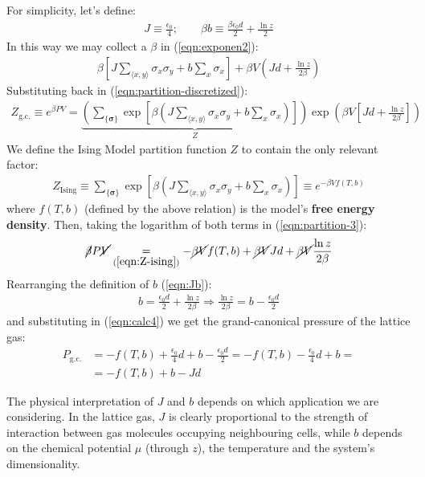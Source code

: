 \documentclass[../../main.tex]{subfiles}
\begin{document}
For simplicity, let's define:
\begin{align}\label{eqn:Jb}
    J \equiv \frac{\epsilon_0}{4}; \qquad \beta b \equiv \frac{\beta \epsilon_0 d}{2} + \frac{\ln z}{2}   
\end{align}
In this way we may collect a $\beta$ in (\ref{eqn:exponen2}):
\begin{align*}
    \beta \left[J \sum_{\langle x,y \rangle} \sigma_x \sigma_y + b \sum_x \sigma_x\right] + \beta V \left(J d + \frac{\ln z}{2 \beta} \right)
\end{align*}
Substituting back in (\ref{eqn:partition-discretized}):
\begin{align}\label{eqn:partition-3}
    Z_{\mathrm{g.c.}} \equiv e^{\beta PV} =\underbrace{ \left(\sum_{\{\bm{\sigma}\}} \exp\left[\beta \left(J \sum_{\langle x,y \rangle} \sigma_x \sigma_y + b \sum_x \sigma_x\right)\right] \right)}_{Z} \exp\left(\beta V \left[Jd + \frac{\ln z}{2 \beta} \right]\right)
\end{align}
We define the Ising Model partition function $Z$ to contain the only relevant factor:
\begin{align} \label{eqn:Z-ising}
    Z_{\mathrm{Ising}} \equiv \sum_{\{\bm{\sigma}\}} \exp\left[\beta \left(J \sum_{\langle x,y \rangle} \sigma_x \sigma_y + b \sum_x \sigma_x\right)\right] \equiv e^{-\beta V f(T,b)}
\end{align}
where $f(T,b)$ (defined by the above relation) is the model's \textbf{free energy density}. Then, taking the logarithm of both terms in (\ref{eqn:partition-3}):
\begin{align}\label{eqn:calc4}
    \cancel{\beta }P \cancel{V} \underset{(\ref{eqn:Z-ising})}{=}  -\cancel{\beta V} f(T,b) +\cancel{ \beta V} J d + \cancel{\beta V} \frac{\ln z}{2 \beta} 
\end{align}
Rearranging the definition of $b$ (\ref{eqn:Jb}):
\begin{align*}
    b = \frac{\epsilon_0 d}{2} + \frac{\ln z}{2 \beta} \Rightarrow \frac{\ln z}{2 \beta} = b - \frac{\epsilon_0 d}{2}    
\end{align*}
and substituting in (\ref{eqn:calc4}) we get the grand-canonical pressure of the lattice gas:
\begin{align}\nonumber
    P_{\mathrm{g.c.}} &= -f(T,b) + \frac{\epsilon_0}{4} d + b - \frac{\epsilon_0 d}{2} = -f(T,b) -\frac{\epsilon_0}{4} d + b =\\
    &= -f(T,b) +b - Jd   \label{eqn:Pgc}
\end{align}

The physical interpretation of $J$ and $b$ depends on which application we are considering. In the lattice gas, $J$ is clearly proportional to the strength of interaction between gas molecules occupying neighbouring cells, while $b$ depends on the chemical potential $\mu$ (through $z$), the temperature and the system's dimensionality. 
\end{document}
